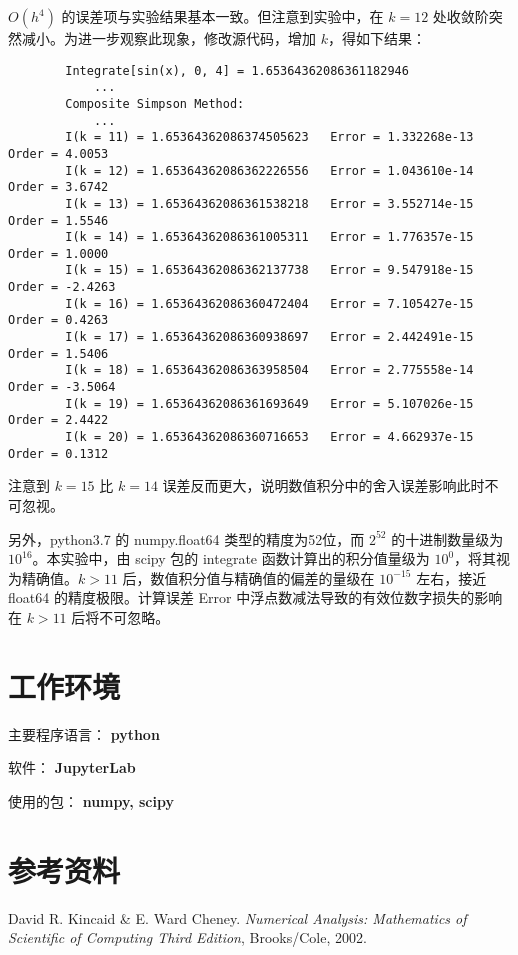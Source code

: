 \documentclass{ctexart}
\begin{document}
	$O(h^4)$ 的误差项与实验结果基本一致。但注意到实验中，在 $k = 12$ 处收敛阶突然减小。为进一步观察此现象，修改源代码，增加 $k$，得如下结果：
	\begin{verbatim}
		Integrate[sin(x), 0, 4] = 1.65364362086361182946
			...
		Composite Simpson Method:
			...		
		I(k = 11) = 1.65364362086374505623 	 Error = 1.332268e-13 	 Order = 4.0053
		I(k = 12) = 1.65364362086362226556 	 Error = 1.043610e-14 	 Order = 3.6742
		I(k = 13) = 1.65364362086361538218 	 Error = 3.552714e-15 	 Order = 1.5546
		I(k = 14) = 1.65364362086361005311 	 Error = 1.776357e-15 	 Order = 1.0000
		I(k = 15) = 1.65364362086362137738 	 Error = 9.547918e-15 	 Order = -2.4263
		I(k = 16) = 1.65364362086360472404 	 Error = 7.105427e-15 	 Order = 0.4263
		I(k = 17) = 1.65364362086360938697 	 Error = 2.442491e-15 	 Order = 1.5406
		I(k = 18) = 1.65364362086363958504 	 Error = 2.775558e-14 	 Order = -3.5064
		I(k = 19) = 1.65364362086361693649 	 Error = 5.107026e-15 	 Order = 2.4422
		I(k = 20) = 1.65364362086360716653 	 Error = 4.662937e-15 	 Order = 0.1312
	\end{verbatim}
	
	注意到 $k = 15$ 比 $k = 14$ 误差反而更大，说明数值积分中的舍入误差影响此时不可忽视。
		
	另外，python3.7 的 numpy.float64 类型的精度为52位，而 $2^{52}$ 的十进制数量级为 $10^{16}$。本实验中，由 scipy 包的 integrate 函数计算出的积分值量级为 $10^0$，将其视为精确值。$k > 11$ 后，数值积分值与精确值的偏差的量级在 $10^{-15}$ 左右，接近 float64 的精度极限。计算误差 Error 中浮点数减法导致的有效位数字损失的影响在 $k > 11$ 后将不可忽略。
	
\section*{工作环境}
	主要程序语言： {\bf python}

	软件： {\bf JupyterLab}
	
	使用的包： {\bf numpy, scipy}
	
\section*{参考资料}
	\noindent [1] David R. Kincaid \& E. Ward Cheney. {\it Numerical Analysis: Mathematics of Scientific of Computing Third Edition}, Brooks/Cole, 2002.
\end{document}

